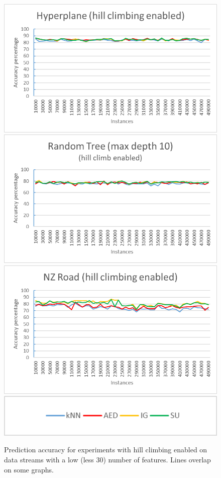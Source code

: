\begin{figure}[h]
\begin{center}
\includegraphics[scale=0.25]{Graphs/Hyperplane/H_graph}
\includegraphics[scale=0.25]{Graphs/TreeD10/H_graph}
\includegraphics[scale=0.25]{Graphs/NZRoad/H_graph}
\includegraphics[scale=0.5]{Graphs/legend}
\caption{Prediction accuracy for experiments with hill climbing enabled on data streams with a low (less 30) number of features. Lines overlap on some graphs.}
\label{fig:graphs_h}
\end{center}
\end{figure}


